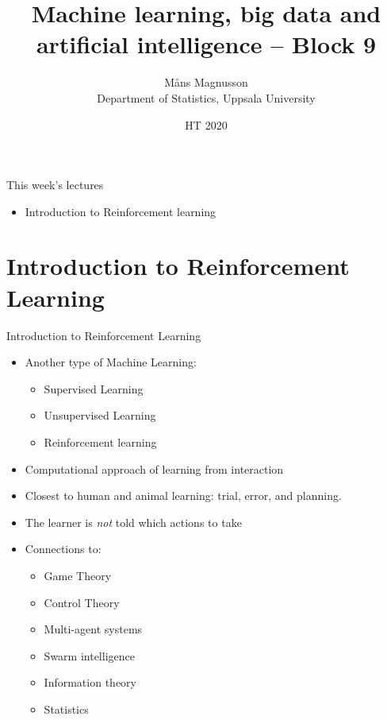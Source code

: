 \documentclass[10pt]{beamer}
\title[]{{\color{black}Machine learning, big data and artificial intelligence -- Block 9}}
\author[]{M{\aa}ns Magnusson\\Department of Statistics, Uppsala University}
\date{HT 2020}
\begin{document}
\frame{\titlepage
}



\begin{frame}{This week's lectures}
\begin{itemize}
\item Introduction to Reinforcement learning
\end{itemize}
\end{frame}



\section{Introduction to Reinforcement Learning}

\begin{frame}{Introduction to Reinforcement Learning}

\begin{itemize}
\item Another type of Machine Learning:
\begin{itemize}
\item Supervised Learning
\item Unsupervised Learning
\item {\color{uured} Reinforcement learning}
\end{itemize}
\pause
\item Computational approach of {\color{uured} learning from interaction}
\item Closest to human and animal learning: {\color{uured} trial, error, and planning.}
\item The learner is \emph{not} told which actions to take
\pause
\item Connections to:
\begin{itemize}
\item Game Theory
\item Control Theory
\item Multi-agent systems
\item Swarm intelligence
\item Information theory
\item Statistics
\end{itemize}
\end{itemize}

\end{frame}
\end{document}

